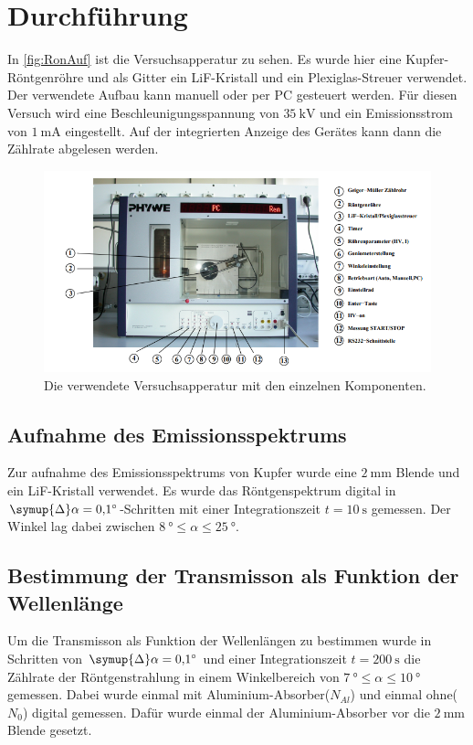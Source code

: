 \section{Durchführung}
\label{sec:Durchführung}
In \autoref{fig:RonAuf} ist die Versuchsapperatur zu sehen. Es wurde hier eine Kupfer-Röntgenröhre und als Gitter ein LiF-Kristall
und ein Plexiglas-Streuer verwendet. Der verwendete Aufbau kann manuell oder per PC gesteuert werden. Für diesen Versuch wird
eine Beschleunigungsspannung von $\SI{35}{\kilo\volt}$ und ein Emissionsstrom von $\SI{1}{\milli\ampere}$ eingestellt.
Auf der integrierten Anzeige des Gerätes kann dann die Zählrate abgelesen werden.
\begin{figure}[H]
    \centering
    \includegraphics[scale=1]{content/RontgenAufbau.png}
    \caption{Die verwendete Versuchsapperatur mit den einzelnen Komponenten.\cite{sample}}
    \label{fig:RonAuf}
\end{figure}

\subsection{Aufnahme des Emissionsspektrums}
Zur aufnahme des Emissionsspektrums von Kupfer wurde eine $\SI{2}{\milli\meter}$ Blende und ein LiF-Kristall verwendet.
Es wurde das Röntgenspektrum digital in $\symup{\Delta}\alpha=\SI{0,1}{\degree}$-Schritten mit einer Integrationszeit $t = \SI{10}{\second}$ gemessen.
Der Winkel lag dabei zwischen $\SI{8}{\degree} \leq \alpha \leq \SI{25}{\degree}$.

\subsection{Bestimmung der Transmisson als Funktion der Wellenlänge}
Um die Transmisson als Funktion der Wellenlängen zu bestimmen wurde in Schritten von $\symup{\Delta}\alpha=\SI{0,1}{\degree}$ und
einer Integrationszeit $t = \SI{200}{\second}$ die Zählrate der Röntgenstrahlung in einem Winkelbereich
von $\SI{7}{\degree}\leq \alpha \leq \SI{10}{\degree}$ gemessen. Dabei wurde einmal mit Aluminium-Absorber($N_{Al}$)
und einmal ohne($N_0$) digital gemessen. Dafür wurde einmal der Aluminium-Absorber vor die $\SI{2}{\milli\meter}$ Blende gesetzt.


